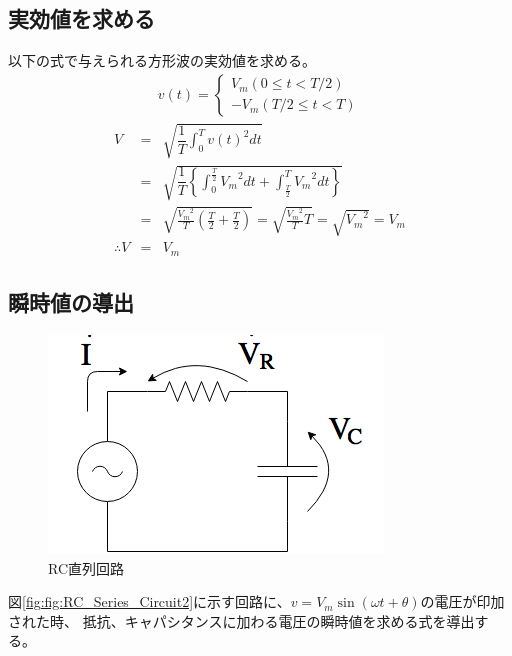 \documentclass[dvipdfmx]{jsarticle}
\begin{document}
\subsection{実効値を求める}
以下の式で与えられる方形波の実効値を求める。
\begin{eqnarray*}
  v(t) = 
  \begin{cases}
    V_m (0\leq t < T/2)\\
    -V_m (T/2 \leq t < T)
  \end{cases}
\end{eqnarray*}
\begin{eqnarray*}
  V & = & \sqrt {\dfrac {1}{T}\int ^{T}_{0}v\left( t\right) ^{2}dt} \\
  & = & \sqrt {\dfrac {1}{T}\left\{ \int ^{\frac{T}{2}}_{0}{V_m}^2 dt+\int ^{T}_{\frac {T}{2}}{V_m}^2 dt\right\} }\\
  & = & \sqrt{\frac{{V_m}^2}{T} (\frac{T}{2} + \frac{T}{2})} = \sqrt{\frac{{V_m}^2}{T} T} = \sqrt{{V_m}^2} = V_m\\
  \therefore V & = & V_m
\end{eqnarray*}

\subsection{瞬時値の導出}
\begin{figure}[h]
  \centering
  \includegraphics[scale=0.4]{RC_Series_Circuit.png}
  \caption{RC直列回路}
  \label{fig:RC_Series_Circuit2}
\end{figure}
図\ref{fig:fig:RC_Series_Circuit2}に示す回路に、$v = V_m\sin(\omega t + \theta)$の電圧が印加された時、
抵抗、キャパシタンスに加わる電圧の瞬時値を求める式を導出する。
\end{document}

